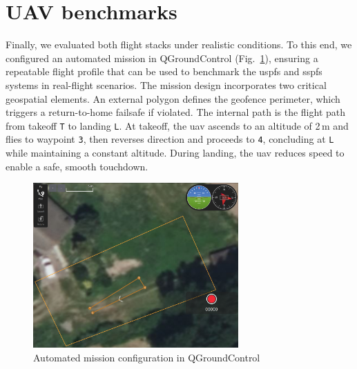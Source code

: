 \section{UAV benchmarks}
\label{sec:uav-benchmarks}
Finally, we evaluated both flight stacks under realistic conditions.
To this end, we configured an automated mission in QGroundControl
(Fig.~\ref{fig:mission-final}), ensuring a repeatable flight profile that can be used
to benchmark the \gls{uspfs} and \gls{sspfs} systems in real-flight scenarios.
%
The mission design incorporates two critical geospatial elements. An
external polygon defines the geofence perimeter, which triggers a
return-to-home failsafe if violated. The internal path is the flight path from
takeoff \lstinline{T} to landing \lstinline{L}. At takeoff, the \gls{uav} ascends
to an altitude of 2\,m and flies to waypoint \lstinline{3}, then reverses
direction and proceeds to \lstinline{4}, concluding at \lstinline{L} while maintaining a constant altitude. During landing, the \gls{uav} reduces speed to enable a safe, smooth touchdown.

\begin{figure}[!hbt]
  \centering
  \includegraphics[width=0.7\textwidth]{./img/png/mission-final} 
  \caption{Automated mission configuration in QGroundControl}%
  \label{fig:mission-final}
\end{figure}

